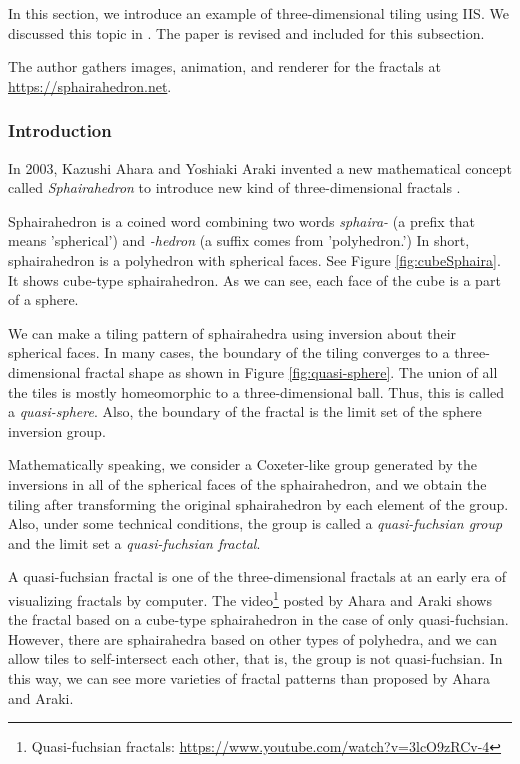 In this section, we introduce an example of three-dimensional
tiling using IIS. 
We discussed this topic in \cite{bridges2018NakamuraAhara}. %
The paper is revised and included for this subsection.

The author gathers images, animation, and renderer for the fractals
at \url{https://sphairahedron.net}.

\subsubsection{Introduction}

In 2003, Kazushi Ahara and Yoshiaki Araki invented a new mathematical
concept called \textit{Sphairahedron} to introduce new kind of
three-dimensional fractals \cite{ahara2003sphairahedral}.

Sphairahedron is a coined word combining two words \textit{sphaira-}
(a prefix that means 'spherical') and \textit{-hedron} (a suffix comes
from 'polyhedron.')
In short, sphairahedron is a polyhedron with spherical faces.
See Figure \ref{fig:cubeSphaira}.
It shows cube-type sphairahedron. 
As we can see, each face of the cube is a part of a sphere.

We can make a tiling pattern of sphairahedra using inversion about their
spherical faces.
In many cases, the boundary of the tiling converges to a three-dimensional fractal
shape as shown in Figure \ref{fig:quasi-sphere}.
The union of all the tiles is mostly homeomorphic to a three-dimensional
ball. Thus, this is called a \textit{quasi-sphere}.
Also, the boundary of the fractal is the limit set of the sphere
inversion group.

Mathematically speaking, we consider a Coxeter-like group generated by the
inversions in all of the spherical faces of the sphairahedron, and
we obtain the tiling after transforming the original sphairahedron by
each element of the group.
Also, under some technical conditions, the group is called a
\textit{quasi-fuchsian group} and the limit set a \textit{quasi-fuchsian
fractal}.

A quasi-fuchsian fractal is one of the three-dimensional
fractals at an early era of visualizing fractals by computer.
The video\footnote{Quasi-fuchsian fractals:
\url{https://www.youtube.com/watch?v=3lcO9zRCv-4}}
posted by Ahara and Araki shows the fractal based on a cube-type
sphairahedron in the case of only quasi-fuchsian.
However, there are sphairahedra based on other types of polyhedra, and
we can allow tiles to self-intersect each other, that is, the group is
not quasi-fuchsian.
In this way, we can see more varieties of fractal patterns
than proposed by Ahara and Araki.
         
